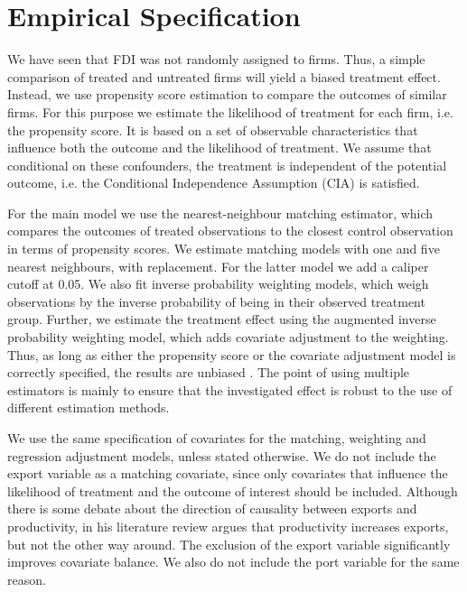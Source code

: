 \documentclass[a4paper,11pt]{scrartcl}
\begin{document}
\newpage
\section{Empirical Specification}

We have seen that FDI was not randomly assigned to firms. Thus, a simple comparison of treated and untreated firms will yield a biased treatment effect. %
Instead, we use propensity score estimation to compare the outcomes of similar firms. For this purpose we estimate the likelihood of treatment for each firm, i.e. the propensity score. It is based on a set of observable characteristics that influence both the outcome and the likelihood of treatment. We assume that conditional on these confounders, the treatment is independent of the potential outcome, i.e. the Conditional Independence Assumption (CIA) is satisfied. 

For the main model we use the nearest-neighbour matching estimator, which compares the outcomes of treated observations to the closest control observation in terms of propensity scores. We estimate matching models  with one and five nearest neighbours, with replacement. For the latter model we add a caliper cutoff at 0.05. We also fit inverse probability weighting models, which weigh observations by the inverse probability of being in their observed treatment group. Further, we estimate the treatment effect using the augmented inverse probability weighting model, which adds covariate adjustment to the weighting. Thus, as long as either the propensity score or the covariate adjustment model is correctly specified, the results are unbiased \citep[p.~393]{imbens2015}. The point of using multiple estimators is mainly to ensure that the investigated effect is robust to the use of different estimation methods.  

We use the same specification of covariates for the matching, weighting and regression adjustment models, unless stated otherwise. We do not include the export variable as a matching covariate, since only covariates that influence the likelihood of treatment and the outcome of interest should be included.
Although there is some debate about the direction of causality between exports and productivity, in his literature review \citet{wagner2007} argues that productivity increases exports, but not the other way around. The exclusion of the export variable significantly improves covariate balance. We also do not include the port variable for the same reason.
\end{document}
